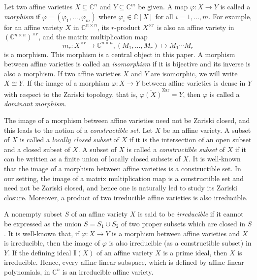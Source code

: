 \documentclass[reqno]{amsart}
\theoremstyle{definition}
\numberwithin{equation}{section}
\begin{document}
Let two affine varieties $X \subseteq \mathbb{C}^n$ and $Y \subseteq \mathbb{C}^m$ be given. A map $\varphi:X \rightarrow Y$ is called a \emph{morphism} if $\varphi=(\varphi_1,...,\varphi_m)$ where $\varphi_i \in \mathbb{C}[X]$ for all $i=1,...,m$. For example, for an affine variety $X$ in $\mathbb{C}^{n \times n}$, its $r$-product $X^{\times r}$ is also an affine variety in $(\mathbb{C}^{n \times n})^{\times r}$, and the matrix multiplication map 
\begin{equation}\label{eq:matrix multiplication map}
    m_r:X^{\times r} \rightarrow \mathbb{C}^{n \times n}, (M_1,...,M_r) \mapsto M_1\cdots M_r
\end{equation}
is a morphism. This morphism is a central object in this paper. A morphism between affine varieties is called an \emph{isomorphism} if it is bijective and its inverse is also a morphism. If two affine varieties $X$ and $Y$ are isomorphic, we will write $X \cong Y$. If the image of a morphism $\varphi:X \rightarrow Y$ between affine varieties is dense in $Y$ with respect to the Zariski topology, that is, $\overline{\varphi(X)}^{\text{Zar}}=Y$, then $\varphi$ is called a \emph{dominant morphism}.

The image of a morphism between affine varieties need not be Zariski closed, and this leads to the notion of a \emph{constructible set}. Let $X$ be an affine variety. A subset of $X$ is called a \emph{locally closed subset} of $X$ if it is the intersection of an open subset and a closed subset of $X$. A subset of $X$ is called a \emph{constructible subset} of $X$ if it can be written as a finite union of locally closed subsets of $X$. It is well-known that the image of a morphism between affine varieties is a constructible set. In our setting, the image of a matrix multiplication map is a constructible set and need not be Zariski closed, and hence one is naturally led to study its Zariski closure. Moreover, a product of two irreducible affine varieties is also irreducible.

A nonempty subset $S$ of an affine variety $X$ is said to be \emph{irreducible} if it cannot be expressed as the union $S=S_1 \cup S_2$ of two proper subsets which are closed in $S$. It is well-known that, if $\varphi:X \rightarrow Y$ is a morphism between affine varieties and $X$ is irreducible, then the image of $\varphi$ is also irreducible (as a constructible subset) in $Y$. If the defining ideal $\mathbf{I}(X)$ of an affine variety $X$ is a prime ideal, then $X$ is irreducible. Hence, every affine linear subspace, which is defined by affine linear polynomials, in $\mathbb{C}^n$ is an irreducible affine variety.
\end{document}
